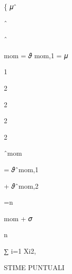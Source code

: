 \documentclass[a4paper,portrait,12pt]{article}
\begin{document}
\begin{flushleft}
\{ 𝜇ˆ
\end{flushleft}





ˆ





ˆ


\begin{flushleft}
mom = 𝜗 mom,1 = 𝜇
\end{flushleft}





1


2


2


2


2


\begin{flushleft}
ˆmom
\end{flushleft}


\begin{flushleft}
= 𝜗ˆmom,1
\end{flushleft}


\begin{flushleft}
+ 𝜗ˆmom,2
\end{flushleft}


\begin{flushleft}
=n
\end{flushleft}


\begin{flushleft}
mom + 𝜎
\end{flushleft}





\begin{flushleft}
n
\end{flushleft}





\begin{flushleft}
∑ i=1 Xi2,
\end{flushleft}










\begin{flushleft}
STIME PUNTUALI
\end{flushleft}
\end{document}
